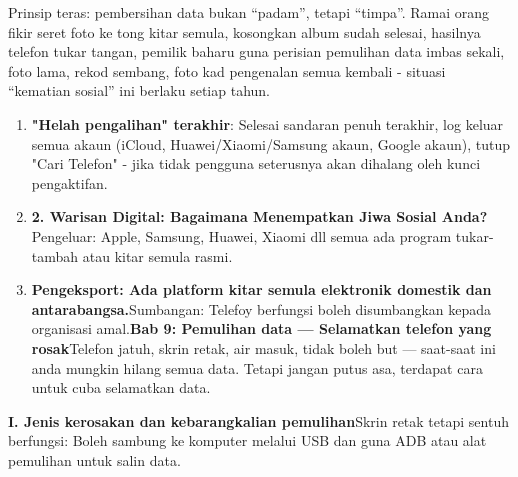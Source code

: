 


Prinsip teras: pembersihan data bukan “padam”, tetapi “timpa”. Ramai orang fikir seret foto ke tong kitar semula, kosongkan album sudah selesai, hasilnya telefon tukar tangan, pemilik baharu guna perisian pemulihan data imbas sekali, foto lama, rekod sembang, foto kad pengenalan semua kembali - situasi “kematian sosial” ini berlaku setiap tahun.

\begin{enumerate}
  \item \textbf{"Helah pengalihan" terakhir}: Selesai sandaran penuh terakhir, log keluar semua akaun (iCloud, Huawei/Xiaomi/Samsung akaun, Google akaun), tutup "Cari Telefon" - jika tidak pengguna seterusnya akan dihalang oleh kunci pengaktifan.
  \item \textbf{2. Warisan Digital: Bagaimana Menempatkan Jiwa Sosial Anda?}Pengeluar: Apple, Samsung, Huawei, Xiaomi dll semua ada program tukar-tambah atau kitar semula rasmi.
  \item \textbf{Pengeksport: Ada platform kitar semula elektronik domestik dan antarabangsa.}Sumbangan: Telefoy berfungsi boleh disumbangkan kepada organisasi amal.\textbf{Bab 9: Pemulihan data — Selamatkan telefon yang rosak}Telefon jatuh, skrin retak, air masuk, tidak boleh but — saat-saat ini anda mungkin hilang semua data. Tetapi jangan putus asa, terdapat cara untuk cuba selamatkan data.
\end{enumerate}

\textbf{I. Jenis kerosakan dan kebarangkalian pemulihan}Skrin retak tetapi sentuh berfungsi: Boleh sambung ke komputer melalui USB dan guna ADB atau alat pemulihan untuk salin data.

